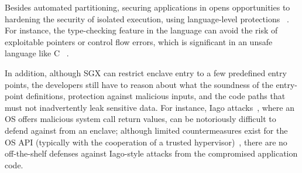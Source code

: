 {%

Besides automated partitioning,
securing \java{} applications in \sgx{} opens opportunities to hardening the security of isolated execution,
using language-level protections
~\citep{bittau2008wedge,brumley2004privtrans,khatiwala2006data}.
For instance, the type-checking feature in the \java{} language
can avoid the risk of exploitable pointers or control flow errors,
which is significant in an unsafe language like C
~\citep{nergal2001libc,bletsch2011jump,checkoway2010return}.

In addition, although SGX can restrict enclave entry 
to a few predefined entry points,
the developers still have to reason about what the soundness of the
entry-point definitions, protection against malicious inputs,
and the code paths that must not inadvertently leak sensitive data.
For instance, Iago attacks~\citep{iago}, where an OS offers malicious system call return values,
can be notoriously difficult to defend against from an enclave;
although limited countermeasures exist for the OS API (typically with the cooperation of a 
trusted hypervisor)~\citep{kwon2016sego},%
there are no off-the-shelf defenses against Iago-style attacks from the compromised application code.

}
